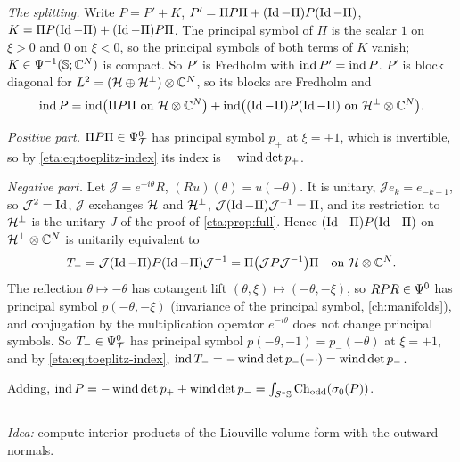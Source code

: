 \emph{The splitting.} Write $P=P'+K$, $P'=\Pi P\Pi+(\operatorname{Id}-\Pi)P(\operatorname{Id}-\Pi)$,
$K=\Pi P(\operatorname{Id}-\Pi)+(\operatorname{Id}-\Pi)P\Pi$. The principal symbol of $\Pi$ is the scalar $1$ on
$\xi>0$ and $0$ on $\xi<0$, so the principal symbols of both terms of $K$ vanish;
$K\in\Psi^{-1}(\mathbb{S};\mathbb{C}^N)$ is compact. So $P'$ is Fredholm with $\operatorname{ind} P'=\operatorname{ind} P$.
$P'$ is block diagonal for $L^2=(\mathcal{H}\oplus\mathcal{H}^\perp)\otimes\mathbb{C}^N$, so its
blocks are Fredholm and
\begin{equation*}
  \operatorname{ind} P=\operatorname{ind}\bigl(\Pi P\Pi\text{ on }\mathcal{H}\otimes\mathbb{C}^N\bigr)
  +\operatorname{ind}\bigl((\operatorname{Id}-\Pi)P(\operatorname{Id}-\Pi)\text{ on }\mathcal{H}^\perp\otimes\mathbb{C}^N\bigr).
\end{equation*}

\emph{Positive part.} $\Pi P\Pi\in\Psi^{0}_{\mathcal{T}}$ has principal symbol $p_+$ at $\xi=+1$,
which is invertible, so by \eqref{eta:eq:toeplitz-index} its index is
$-\operatorname{wind}\det p_+$.

\emph{Negative part.} Let $\mathcal J=e^{-i\theta}R$, $(Ru)(\theta)=u(-\theta)$. It is
unitary, $\mathcal Je_k=e_{-k-1}$, so $\mathcal J^2=\operatorname{Id}$, $\mathcal J$ exchanges
$\mathcal{H}$ and $\mathcal{H}^\perp$, $\mathcal J(\operatorname{Id}-\Pi)\mathcal J^{-1}=\Pi$, and its restriction
to $\mathcal{H}^\perp$ is the unitary $J$ of the proof of \cref{eta:prop:full}. Hence
$(\operatorname{Id}-\Pi)P(\operatorname{Id}-\Pi)$ on $\mathcal{H}^\perp\otimes\mathbb{C}^N$ is unitarily equivalent to
\begin{equation*}
  T_-=\mathcal J(\operatorname{Id}-\Pi)P(\operatorname{Id}-\Pi)\mathcal J^{-1}=\Pi\bigl(\mathcal JP\mathcal J^{-1}\bigr)\Pi
  \quad\text{on }\mathcal{H}\otimes\mathbb{C}^N .
\end{equation*}
The reflection $\theta\mapsto-\theta$ has cotangent lift $(\theta,\xi)\mapsto(-\theta,-\xi)$,
so $RPR\in\Psi^{0}$ has principal symbol $p(-\theta,-\xi)$ (invariance of the
principal symbol, \cref{ch:manifolds}), and conjugation by the multiplication operator
$e^{-i\theta}$ does not change principal symbols. So $T_-\in\Psi^{0}_{\mathcal{T}}$ has principal
symbol $p(-\theta,-1)=p_-(-\theta)$ at $\xi=+1$, and by
\eqref{eta:eq:toeplitz-index}, $\operatorname{ind} T_-=-\operatorname{wind}\det p_-(-\cdot)=\operatorname{wind}\det p_-$.

Adding, $\operatorname{ind} P=-\operatorname{wind}\det p_++\operatorname{wind}\det p_-=\int_{S^*\mathbb{S}}\operatorname{Ch}_{\mathrm{odd}}(\sigma_0(P))$.

\subsection*{}

\emph{Idea:} compute interior products of the Liouville volume form with the
outward normals.

